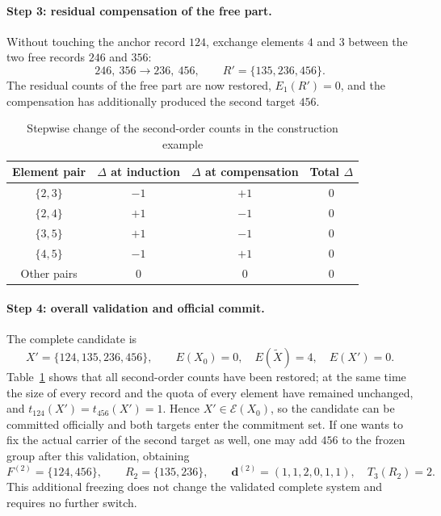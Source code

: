 \documentclass[11pt,a4paper]{article}
\numberwithin{equation}{section}
\theoremstyle{definition}
\numberwithin{algorithm}{section}
\begin{document}
\paragraph{Step 3: residual compensation of the free part.}
Without touching the anchor record $124$, exchange elements $4$ and $3$ between the two free
records $246$ and $356$:
\begin{equation}
246,\ 356\longrightarrow236,\ 456,\qquad
R'=\{135,236,456\}.
\label{eq:directed-example-compensation}
\end{equation}
The residual counts of the free part are now restored, $E_1(R')=0$, and the compensation has
additionally produced the second target $456$.

\begin{table}[htbp]
\centering
\caption{Stepwise change of the second-order counts in the construction example}
\label{tab:directed-example-counts}
\begin{tabular}{cccc}
\toprule
Element pair & $\Delta$ at induction & $\Delta$ at compensation & Total $\Delta$\\
\midrule
$\{2,3\}$ & $-1$ & $+1$ & $0$\\
$\{2,4\}$ & $+1$ & $-1$ & $0$\\
$\{3,5\}$ & $+1$ & $-1$ & $0$\\
$\{4,5\}$ & $-1$ & $+1$ & $0$\\
Other pairs & $0$ & $0$ & $0$\\
\bottomrule
\end{tabular}
\end{table}

\paragraph{Step 4: overall validation and official commit.}
The complete candidate is
\begin{equation}
X'=\{124,135,236,456\},\qquad
E(X_0)=0,\quad E(\widetilde X)=4,\quad E(X')=0.
\label{eq:directed-example-acceptance}
\end{equation}
Table~\ref{tab:directed-example-counts} shows that all second-order counts have been
restored; at the same time the size of every record and the quota of every element have
remained unchanged, and $t_{124}(X')=t_{456}(X')=1$.
Hence $X'\in\mathcal E(X_0)$, so the candidate can be committed officially and both targets
enter the commitment set.
If one wants to fix the actual carrier of the second target as well, one may add $456$ to the
frozen group after this validation, obtaining
\begin{equation}
F^{(2)}=\{124,456\},\qquad R_2=\{135,236\},\qquad
\boldsymbol d^{(2)}=(1,1,2,0,1,1),\quad T_3(R_2)=2.
\label{eq:level-two-example}
\end{equation}
This additional freezing does not change the validated complete system and requires no
further switch.
\end{document}
